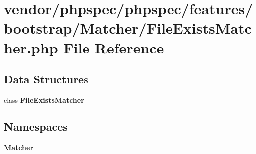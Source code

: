 \section{vendor/phpspec/phpspec/features/bootstrap/\+Matcher/\+File\+Exists\+Matcher.php File Reference}
\label{_file_exists_matcher_8php}
\subsection*{Data Structures}
\begin{DoxyCompactItemize}
\item 
class {\bf File\+Exists\+Matcher}
\end{DoxyCompactItemize}
\subsection*{Namespaces}
\begin{DoxyCompactItemize}
\item 
 {\bf Matcher}
\end{DoxyCompactItemize}
